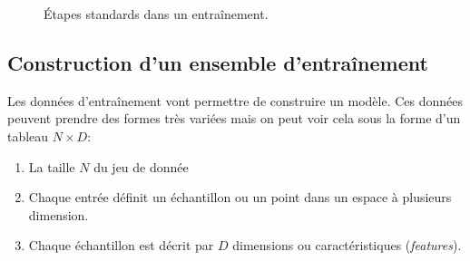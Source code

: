 \documentclass[
  11pt,
  letterpaper,
  open=any,
  twoside=false,
  french]{scrbook}
\begin{document}
\begin{figure}


\caption{\label{fig-pipeline}Étapes standards dans un entraînement.}

\end{figure}%

\subsection{Construction d'un ensemble
d'entraînement}\label{sec-05.02.02}

Les données d'entraînement vont permettre de construire un modèle. Ces
données peuvent prendre des formes très variées mais on peut voir cela
sous la forme d'un tableau \(N \times D\):

\begin{enumerate}
\def\labelenumi{\arabic{enumi}.}
\item
  La taille \(N\) du jeu de donnée
\item
  Chaque entrée définit un échantillon ou un point dans un espace à
  plusieurs dimension.
\item
  Chaque échantillon est décrit par \(D\) dimensions ou caractéristiques
  (\emph{features}).
\end{enumerate}
\end{document}
